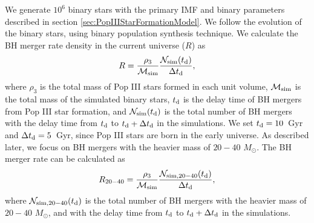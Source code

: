 \documentclass[pdftex]{pasj01}
\newcommand{\msun}{M_\odot}
\newcommand{\dthree}{\rho_{3}}
\newcommand{\rate}{R}
\newcommand{\ratetarget}{R_{20-40}}
\newcommand{\msim}{{\cal M}_{\rm sim}}
\newcommand{\nsim}{{\cal N}_{\rm sim}}
\newcommand{\nsimtarget}{{\cal N}_{\rm sim, 20-40}}
\newcommand{\td}{t_{\rm d}}
\newcommand{\dtd}{\Delta \td}
\begin{document}
We generate $10^6$ binary stars with the primary IMF and binary
parameters described in section \ref{sec:PopIIIStarFormationModel}. We
follow the evolution of the binary stars, using binary population
synthesis technique. We calculate the BH merger rate density in the
current universe ($\rate$) as
\begin{eqnarray}
  \rate = \frac{\dthree}{\msim} \frac{\nsim (\td)}{\dtd},
\end{eqnarray}
where $\dthree$ is the total mass of Pop III stars formed in each unit
volume, $\msim$ is the total mass of the simulated binary stars, $\td$
is the delay time of BH mergers from Pop III star formation, and
$\nsim (\td)$ is the total number of BH mergers with the delay time
from $\td$ to $\td+\dtd$ in the simulations. We set $\td=10$~Gyr and
$\dtd=5$~Gyr, since Pop III stars are born in the early universe. As
described later, we focus on BH mergers with the heavier mass of
$20-40$ $\msun$. The BH merger rate can be calculated as
\begin{eqnarray}
  \ratetarget = \frac{\dthree}{\msim} \frac{\nsimtarget (\td)}{\dtd},
\end{eqnarray}
where $\nsimtarget (\td)$ is the total number of BH mergers with the
heavier mass of $20-40$ $\msun$, and with the delay time from $\td$ to
$\td+\dtd$ in the simulations.
\end{document}
